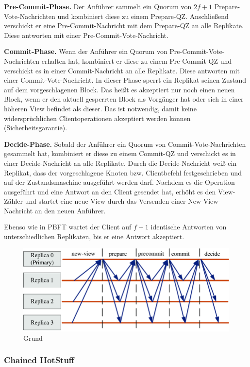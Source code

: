 \documentclass[nonacm,sigconf,natbib=false]{acmart}
\begin{document}
\textbf{Pre-Commit-Phase.} Der Anführer sammelt ein Quorum von $2f+1$ Prepare-Vote-Nachrichten und kombiniert diese zu einem Prepare-QZ. Anschließend verschickt er eine Pre-Commit-Nachricht mit dem Prepare-QZ an alle Replikate. Diese antworten mit einer Pre-Commit-Vote-Nachricht.

\textbf{Commit-Phase.} Wenn der Anführer ein Quorum von Pre-Commit-Vote-Nachrichten erhalten hat, kombiniert er diese zu einem Pre-Commit-QZ und verschickt es in einer Commit-Nachricht an alle Replikate. Diese antworten mit einer Commit-Vote-Nachricht. In dieser Phase sperrt ein Replikat seinen Zustand auf dem vorgeschlagenen Block. Das heißt es akzeptiert nur noch einen neuen Block, wenn er den aktuell gesperrten Block als Vorgänger hat oder sich in einer höheren View befindet als dieser. Das ist notwendig, damit keine widersprüchlichen Clientoperationen akzeptiert werden können (Sicherheitsgarantie).

\textbf{Decide-Phase.} Sobald der Anführer ein Quorum von Commit-Vote-Nachrichten gesammelt hat, kombiniert er diese zu einem Commit-QZ und verschickt es in einer Decide-Nachricht an alle Replikate. Durch die Decide-Nachricht weiß ein Replikat, dass der vorgeschlagene Knoten bzw. Clientbefehl festgeschrieben und auf der Zustandsmaschine ausgeführt werden darf. Nachdem es die Operation ausgeführt und eine Antwort an den Client gesendet hat, erhöht es den View-Zähler und startet eine neue View durch das Versenden einer New-View-Nachricht an den neuen Anführer.

Ebenso wie in PBFT wartet der Client auf $f+1$ identische Antworten von unterschiedlichen Replikaten, bis er eine Antwort akzeptiert.

\begin{figure}
  \centering
  \includegraphics[width=\linewidth]{hotstuff.png}
  \caption{Grund}
  \label{fig:hotstuff}
\end{figure}

\subsubsection{Chained HotStuff}
\end{document}
